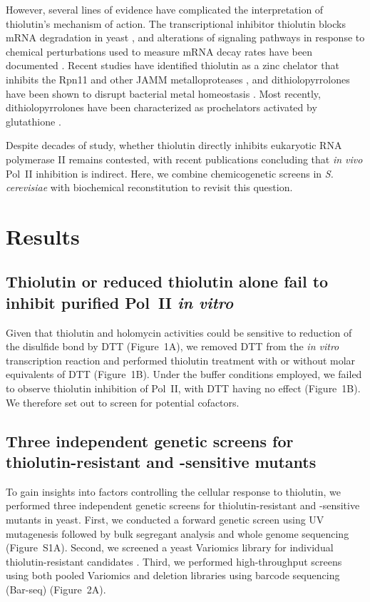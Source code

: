 \documentclass[11pt]{article}
\begin{document}
However, several lines of evidence have complicated the interpretation of thiolutin's mechanism of action. The transcriptional inhibitor thiolutin blocks mRNA degradation in yeast \citep{pelechano2008}, and alterations of signaling pathways in response to chemical perturbations used to measure mRNA decay rates have been documented \citep{guan2020}. Recent studies have identified thiolutin as a zinc chelator that inhibits the Rpn11 and other JAMM metalloproteases \citep{robertson2018}, and dithiolopyrrolones have been shown to disrupt bacterial metal homeostasis \citep{chan2017}. Most recently, dithiolopyrrolones have been characterized as prochelators activated by glutathione \citep{lauinger2023}.

Despite decades of study, whether thiolutin directly inhibits eukaryotic RNA polymerase II remains contested, with recent publications concluding that \textit{in vivo} Pol~II inhibition is indirect. Here, we combine chemicogenetic screens in \textit{S. cerevisiae} with biochemical reconstitution to revisit this question.

\section{Results}

\subsection{Thiolutin or reduced thiolutin alone fail to inhibit purified Pol~II \textit{in vitro}}

Given that thiolutin and holomycin activities could be sensitive to reduction of the disulfide bond by DTT \citep{li2011holomycin,lauinger2023} (Figure~1A), we removed DTT from the \textit{in vitro} transcription reaction and performed thiolutin treatment with or without molar equivalents of DTT (Figure~1B). Under the buffer conditions employed, we failed to observe thiolutin inhibition of Pol~II, with DTT having no effect (Figure~1B). We therefore set out to screen for potential cofactors.

\subsection{Three independent genetic screens for thiolutin-resistant and -sensitive mutants}

To gain insights into factors controlling the cellular response to thiolutin, we performed three independent genetic screens for thiolutin-resistant and -sensitive mutants in yeast. First, we conducted a forward genetic screen using UV mutagenesis followed by bulk segregant analysis and whole genome sequencing (Figure~S1A). Second, we screened a yeast Variomics library for individual thiolutin-resistant candidates \citep{pan2006}. Third, we performed high-throughput screens using both pooled Variomics and deletion libraries using barcode sequencing (Bar-seq) \citep{smith2009,lee2014} (Figure~2A).
\end{document}
